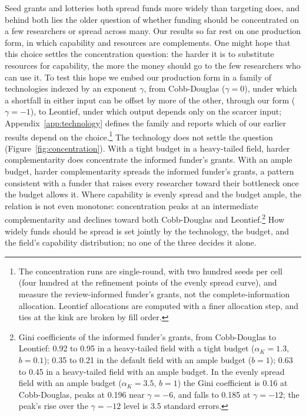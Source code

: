 \documentclass[article, 11pt, reqno]{amsart}
\theoremstyle{named}
\begin{document}
Seed grants and lotteries both spread funds more widely than targeting does, and
behind both lies the older question of whether funding should be concentrated on a few
researchers or spread across many. Our results so far rest on one production form, in
which capability and resources are complements. One might hope that this choice
settles the concentration question: the harder it is to substitute resources for
capability, the more the money should go to the few researchers who can use it. To
test this hope we embed our production form in a family of technologies indexed by an
exponent $\gamma$, from Cobb-Douglas ($\gamma = 0$), under which a shortfall in either
input can be offset by more of the other, through our form ($\gamma = -1$), to Leontief,
under which output depends only on the scarcer input; Appendix~\ref{app:technology}
defines the family and reports which of our earlier results depend on the
choice.\footnote{The concentration runs are single-round, with two hundred seeds per
cell (four hundred at the refinement points of the evenly spread curve), and measure
the review-informed funder's grants, not the complete-information allocation. Leontief
allocations are computed with a finer allocation step, and ties at the kink are broken
by fill order.} The technology does not settle the question
(Figure~\ref{fig:concentration}). With a tight budget in a heavy-tailed field, harder
complementarity does concentrate the informed funder's grants. With an ample budget,
harder complementarity spreads the informed funder's grants, a pattern consistent with
a funder that raises every researcher toward their bottleneck once the budget allows
it. Where capability is evenly spread and the budget ample, the relation is not even
monotone: concentration peaks at an intermediate complementarity and declines toward
both Cobb-Douglas and Leontief.\footnote{Gini coefficients of the informed funder's
grants, from Cobb-Douglas to Leontief: 0.92 to 0.95 in a heavy-tailed field with a
tight budget ($\alpha_K = 1.3$, $b = 0.1$); 0.35 to 0.21 in the default field with an
ample budget ($b = 1$); 0.63 to 0.45 in a heavy-tailed field with an ample budget. In
the evenly spread field with an ample budget ($\alpha_K = 3.5$, $b = 1$) the Gini
coefficient is 0.16 at Cobb-Douglas, peaks at 0.196 near $\gamma = -6$, and falls to
0.185 at $\gamma = -12$; the peak's rise over the $\gamma = -12$ level is 3.5 standard
errors.} How widely funds should be spread is set jointly by the technology, the
budget, and the field's capability distribution; no one of the three decides it alone.
\end{document}
